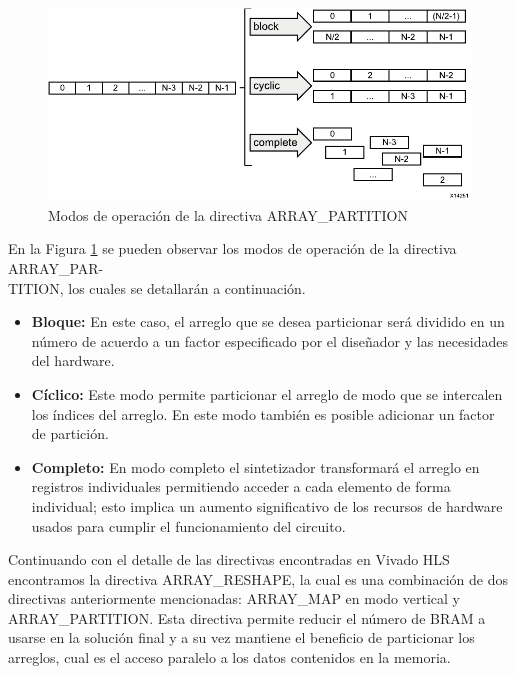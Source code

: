 \begin{figure}[H]
	\centering
		\includegraphics[scale=0.8]{./Figures/HLS5.pdf}
	\caption{Modos de operación de la directiva ARRAY\_PARTITION \citep{HLS2015}}
	\label{fig:HLS5}
\end{figure}

En la Figura \ref{fig:HLS5} se pueden observar los modos de operación de la directiva ARRAY\_PAR-\\TITION, los cuales se detallarán a continuación.

\begin{itemize}
\item \textbf{Bloque:} En este caso, el arreglo que se desea particionar será dividido en un número de acuerdo a un factor especificado por el diseñador y las necesidades del hardware.

\item \textbf{Cíclico:} Este modo permite particionar el arreglo de modo que se intercalen los índices del arreglo. En este modo también es posible adicionar un factor de partición.

\item \textbf{Completo:} En modo completo el sintetizador transformará el arreglo en registros individuales permitiendo acceder a cada elemento de forma individual; esto implica un aumento significativo de los recursos de hardware usados para cumplir el funcionamiento del circuito.
\end{itemize}

Continuando con el detalle de las directivas encontradas en Vivado HLS encontramos la directiva ARRAY\_RESHAPE, la cual es una combinación de  dos directivas anteriormente mencionadas: ARRAY\_MAP en modo vertical y ARRAY\_PARTITION. Esta directiva permite reducir el número de BRAM a usarse en la solución final y a su vez mantiene el beneficio de particionar los arreglos, cual es el acceso paralelo a los datos contenidos en la memoria.

